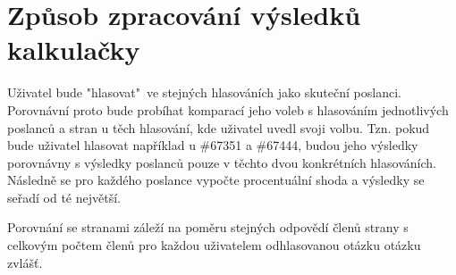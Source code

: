 \section{Způsob zpracování výsledků kalkulačky}
Uživatel bude "hlasovat"\ ve stejných hlasováních jako skuteční poslanci. Porovnávní proto bude probíhat komparací jeho voleb s hlasováním jednotlivých poslanců a stran u těch hlasování, kde uživatel uvedl svoji volbu. Tzn. pokud bude uživatel hlasovat například u \#67351 a \#67444, budou jeho výsledky porovnávny s výsledky poslanců pouze v těchto dvou konkrétních hlasováních. Následně se pro každého poslance vypočte procentuální shoda a výsledky se seřadí od té největší.

\par Porovnání se stranami záleží na poměru stejných odpovědí členů strany s celkovým počtem členů pro každou uživatelem odhlasovanou otázku otázku zvlášť.



